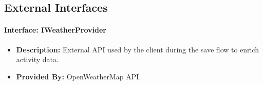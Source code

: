 \subsection{External Interfaces}

\paragraph{Interface: IWeatherProvider}
\begin{itemize}
    \item \textbf{Description:} External API used by the client during the save flow to enrich activity data.
    \item \textbf{Provided By:} OpenWeatherMap API.
\end{itemize}

\begin{table}[H]
\centering
\renewcommand{\arraystretch}{1.4}
\caption{IWeatherProvider Interface}
\end{table}